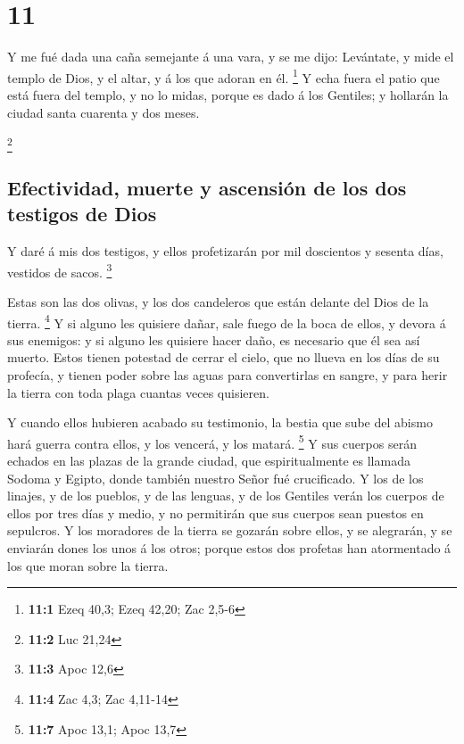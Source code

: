 \hypertarget{section-10}{%
\section{11}\label{section-10}}

 Y me fué dada una caña semejante á una vara, y se me
dijo: Levántate, y mide el templo de Dios, y el altar, y á los que
adoran en él. \footnote{\textbf{11:1} Ezeq 40,3; Ezeq 42,20; Zac 2,5-6}
 Y echa fuera el patio que está fuera del templo, y no lo
midas, porque es dado á los Gentiles; y hollarán la ciudad santa
cuarenta y dos meses.

\footnote{\textbf{11:2} Luc 21,24}

\hypertarget{efectividad-muerte-y-ascensiuxf3n-de-los-dos-testigos-de-dios}{%
\subsection{Efectividad, muerte y ascensión de los dos testigos de
Dios}\label{efectividad-muerte-y-ascensiuxf3n-de-los-dos-testigos-de-dios}}

 Y daré á mis dos testigos, y ellos profetizarán por mil
doscientos y sesenta días, vestidos de sacos. \footnote{\textbf{11:3}
  Apoc 12,6}

 Estas son las dos olivas, y los dos candeleros que están
delante del Dios de la tierra. \footnote{\textbf{11:4} Zac 4,3; Zac
  4,11-14}  Y si alguno les quisiere dañar, sale fuego de
la boca de ellos, y devora á sus enemigos: y si alguno les quisiere
hacer daño, es necesario que él sea así muerto.  Estos
tienen potestad de cerrar el cielo, que no llueva en los días de su
profecía, y tienen poder sobre las aguas para convertirlas en sangre, y
para herir la tierra con toda plaga cuantas veces quisieren.

 Y cuando ellos hubieren acabado su testimonio, la bestia
que sube del abismo hará guerra contra ellos, y los vencerá, y los
matará. \footnote{\textbf{11:7} Apoc 13,1; Apoc 13,7}  Y
sus cuerpos serán echados en las plazas de la grande ciudad, que
espiritualmente es llamada Sodoma y Egipto, donde también nuestro Señor
fué crucificado.  Y los de los linajes, y de los pueblos,
y de las lenguas, y de los Gentiles verán los cuerpos de ellos por tres
días y medio, y no permitirán que sus cuerpos sean puestos en sepulcros.
 Y los moradores de la tierra se gozarán sobre ellos, y
se alegrarán, y se enviarán dones los unos á los otros; porque estos dos
profetas han atormentado á los que moran sobre la tierra.

